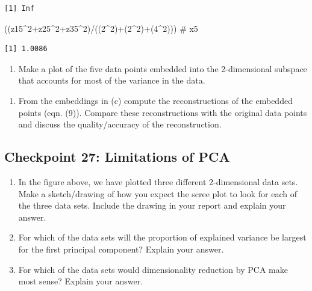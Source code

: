 \documentclass[
  letterpaper,
  DIV=11,
  numbers=noendperiod]{scrartcl}
\newenvironment{Shaded}{\begin{snugshade}}{\end{snugshade}}
\newcommand{\CommentTok}[1]{\textcolor[rgb]{0.37,0.37,0.37}{#1}}
\newcommand{\DecValTok}[1]{\textcolor[rgb]{0.68,0.00,0.00}{#1}}
\newcommand{\NormalTok}[1]{\textcolor[rgb]{0.00,0.23,0.31}{#1}}
\newcommand{\SpecialCharTok}[1]{\textcolor[rgb]{0.37,0.37,0.37}{#1}}
\providecommand{\tightlist}{%
  \setlength{\itemsep}{0pt}\setlength{\parskip}{0pt}}\usepackage{longtable,booktabs,array}
\begin{document}
\begin{verbatim}
[1] Inf
\end{verbatim}

\begin{Shaded}
\begin{Highlighting}[]
\NormalTok{((z15}\SpecialCharTok{\^{}}\DecValTok{2}\SpecialCharTok{+}\NormalTok{z25}\SpecialCharTok{\^{}}\DecValTok{2}\SpecialCharTok{+}\NormalTok{z35}\SpecialCharTok{\^{}}\DecValTok{2}\NormalTok{)}\SpecialCharTok{/}\NormalTok{((}\DecValTok{2}\SpecialCharTok{\^{}}\DecValTok{2}\NormalTok{)}\SpecialCharTok{+}\NormalTok{(}\DecValTok{2}\SpecialCharTok{\^{}}\DecValTok{2}\NormalTok{)}\SpecialCharTok{+}\NormalTok{(}\DecValTok{4}\SpecialCharTok{\^{}}\DecValTok{2}\NormalTok{))) }\CommentTok{\# x5}
\end{Highlighting}
\end{Shaded}

\begin{verbatim}
[1] 1.0086
\end{verbatim}

\begin{enumerate}
\def\labelenumi{(\alph{enumi})}
\setcounter{enumi}{2}
\tightlist
\item
  Make a plot of the five data points embedded into the 2-dimensional
  subspace that accounts for most of the variance in the data.
\end{enumerate}

\begin{enumerate}
\def\labelenumi{(\alph{enumi})}
\setcounter{enumi}{3}
\tightlist
\item
  From the embeddings in (c) compute the reconstructions of the embedded
  points (eqn. (9)). Compare these reconstructions with the original
  data points and discuss the quality/accuracy of the reconstruction.
\end{enumerate}

\hypertarget{checkpoint-27-limitations-of-pca}{%
\subsection{Checkpoint 27: Limitations of
PCA}\label{checkpoint-27-limitations-of-pca}}

\begin{enumerate}
\def\labelenumi{(\alph{enumi})}
\item
  In the figure above, we have plotted three different 2-dimensional
  data sets. Make a sketch/drawing of how you expect the scree plot to
  look for each of the three data sets. Include the drawing in your
  report and explain your answer.
\item
  For which of the data sets will the proportion of explained variance
  be largest for the first principal component? Explain your answer.
\item
  For which of the data sets would dimensionality reduction by PCA make
  most sense? Explain your answer.
\end{enumerate}
\end{document}
